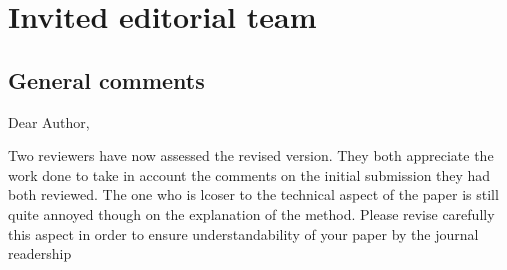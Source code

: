 \section*{Invited editorial team}\label{editor}

\subsection*{General comments}
\RC{} Dear Author,

\RC*{} Two reviewers have now assessed the revised version. They both appreciate the work done to take in account the comments on the initial submission they had both reviewed. The one who is lcoser to the technical aspect of the paper is still quite annoyed though on the explanation of the method. Please revise carefully this aspect in order to ensure understandability of your paper by the journal readership

